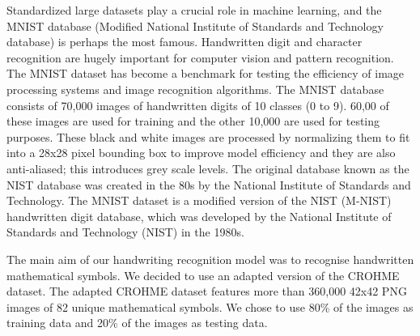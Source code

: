 \documentclass[twocolumn,pra,floatfix]{revtex4-2}
\begin{document}
                Standardized large datasets play a crucial role in machine learning, and the MNIST database\cite{lecun2010mnist} (Modified National Institute of Standards and Technology database) is perhaps the most famous. Handwritten digit and character recognition are hugely important for computer vision and pattern recognition. The MNIST dataset has become a benchmark for testing the efficiency of image processing systems and image recognition algorithms. The MNIST database consists of 70,000 images of handwritten digits of 10 classes (0 to 9). 60,00 of these images are used for training and the other 10,000 are used for testing purposes. These black and white images are processed by normalizing them to fit into a 28x28 pixel bounding box to improve model efficiency and they are also anti-aliased; this introduces grey scale levels. The original database known as the NIST database was created in the 80s by the National Institute of Standards and Technology. The MNIST dataset is a modified version of the NIST (M-NIST) handwritten digit database, which was developed by the National Institute of Standards and Technology (NIST) in the 1980s.

                The main aim of our handwriting recognition model was to recognise handwritten mathematical symbols. We decided to use an adapted version of the CROHME dataset. The adapted CROHME dataset features more than 360,000 42x42 PNG images of 82 unique mathematical symbols. We chose to use 80\% of the images as training data and 20\% of the images as testing data.




\end{document}
